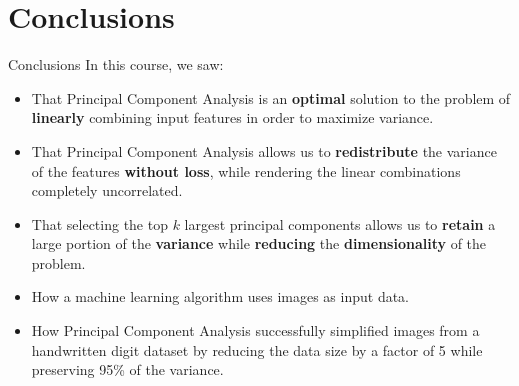 \section{Conclusions}

\begin{frame}{Conclusions}
	In this course, we saw:
	\begin{itemize}
		\item That Principal Component Analysis is an \textbf{optimal} solution to the problem of \textbf{linearly} combining input features in order to maximize variance.
		\pause
		\item That Principal Component Analysis allows us to \textbf{redistribute} the variance of the features \textbf{without loss}, while rendering the linear combinations completely uncorrelated.
		\pause
		\item That selecting the top $k$ largest principal components allows us to \textbf{retain} a large portion of the \textbf{variance} while \textbf{reducing} the \textbf{dimensionality} of the problem.
		\pause
		\item How a machine learning algorithm uses images as input data.
		\pause
		\item How Principal Component Analysis successfully simplified images from a handwritten digit dataset by reducing the data size by a factor of 5 while preserving 95\% of the variance.
	\end{itemize}
\end{frame}